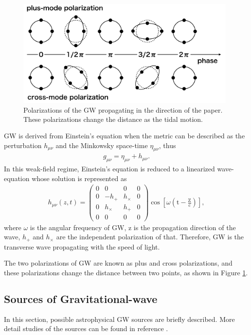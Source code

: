\begin{figure}[t]
  \begin{center}   
    \includegraphics[width=11.0cm]{./img_chap1/img131.png}
    \caption{Polarizations of the GW propagating in the direction of the paper. These polarizations change the distance as the tidal motion. }\label{img:img131}
  \end{center}
\end{figure}

GW is derived from Einstein's equation when the metric can be described as the perturbation $h_{\mu\nu}$ and the Minkowsky space-time $\eta_{\mu\nu}$, thus
\begin{eqnarray}
  g_{\mu \nu}=\eta_{\mu \nu}+h_{\mu \nu}.
\end{eqnarray}
In this weak-field regime, Einstein's equation is reduced to a linearized wave-equation whose solution is represented as
\begin{eqnarray}
  h_{\mu \nu}(z, t)=\left(\begin{array}{cccc}{0} & {0} & {0} & {0} \\ {0} & {-h_{+}} & {h_{\times}} & {0} \\ {0} & {h_{\times}} & {h_{+}} & {0} \\ {0} & {0} & {0} & {0}\end{array}\right) \cos \left[\omega\left(\mathrm{t}-\frac{\mathrm{Z}}{\mathrm{c}}\right)\right], \label{eq:eq130}
\end{eqnarray}
where $\omega$ is the angular frequency of GW, z is the propagation direction of the wave, $h_{+}$ and $h_{\times}$ are the independent polarization of that. Therefore, GW is the transverse wave propagating with the speed of light.

The two polarizations of GW are known as plus and cross polarizations, and these polarizations change the distance between two points, as shown in Figure \ref{img:img131}. 


\subsection{Sources of Gravitational-wave}
In this section, possible astrophysical GW sources are briefly described. More detail studies of the sources can be found in reference \cite{cutler2002overview}.

